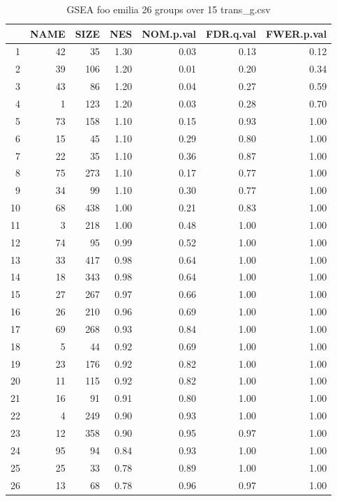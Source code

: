 \begin{table}[ht]
\centering
\begin{tabular}{rrrrrrr}
  \hline
 & NAME & SIZE & NES & NOM.p.val & FDR.q.val & FWER.p.val \\ 
  \hline
1 &  42 &  35 & 1.30 & 0.03 & 0.13 & 0.12 \\ 
  2 &  39 & 106 & 1.20 & 0.01 & 0.20 & 0.34 \\ 
  3 &  43 &  86 & 1.20 & 0.04 & 0.27 & 0.59 \\ 
  4 &   1 & 123 & 1.20 & 0.03 & 0.28 & 0.70 \\ 
  5 &  73 & 158 & 1.10 & 0.15 & 0.93 & 1.00 \\ 
  6 &  15 &  45 & 1.10 & 0.29 & 0.80 & 1.00 \\ 
  7 &  22 &  35 & 1.10 & 0.36 & 0.87 & 1.00 \\ 
  8 &  75 & 273 & 1.10 & 0.17 & 0.77 & 1.00 \\ 
  9 &  34 &  99 & 1.10 & 0.30 & 0.77 & 1.00 \\ 
  10 &  68 & 438 & 1.00 & 0.21 & 0.83 & 1.00 \\ 
  11 &   3 & 218 & 1.00 & 0.48 & 1.00 & 1.00 \\ 
  12 &  74 &  95 & 0.99 & 0.52 & 1.00 & 1.00 \\ 
  13 &  33 & 417 & 0.98 & 0.64 & 1.00 & 1.00 \\ 
  14 &  18 & 343 & 0.98 & 0.64 & 1.00 & 1.00 \\ 
  15 &  27 & 267 & 0.97 & 0.66 & 1.00 & 1.00 \\ 
  16 &  26 & 210 & 0.96 & 0.69 & 1.00 & 1.00 \\ 
  17 &  69 & 268 & 0.93 & 0.84 & 1.00 & 1.00 \\ 
  18 &   5 &  44 & 0.92 & 0.69 & 1.00 & 1.00 \\ 
  19 &  23 & 176 & 0.92 & 0.82 & 1.00 & 1.00 \\ 
  20 &  11 & 115 & 0.92 & 0.82 & 1.00 & 1.00 \\ 
  21 &  16 &  91 & 0.91 & 0.80 & 1.00 & 1.00 \\ 
  22 &   4 & 249 & 0.90 & 0.93 & 1.00 & 1.00 \\ 
  23 &  12 & 358 & 0.90 & 0.95 & 0.97 & 1.00 \\ 
  24 &  95 &  94 & 0.84 & 0.93 & 1.00 & 1.00 \\ 
  25 &  25 &  33 & 0.78 & 0.89 & 1.00 & 1.00 \\ 
  26 &  13 &  68 & 0.78 & 0.96 & 0.97 & 1.00 \\ 
   \hline
\end{tabular}
\caption{GSEA foo emilia 26 groups over 15 trans\_g.csv} 
\label{tab: trans_g_foo emilia.csv}
\end{table}

